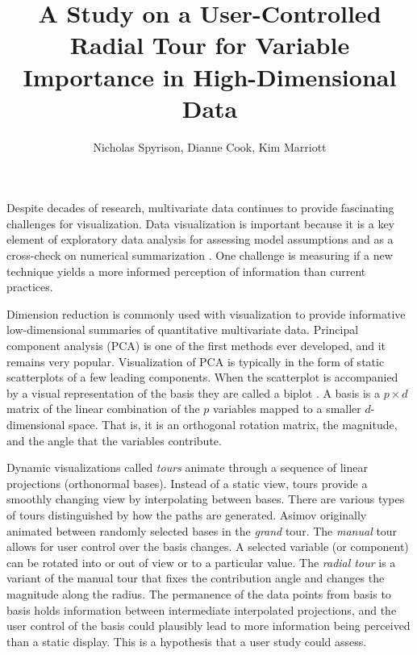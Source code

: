 \documentclass[review,journal]{vgtc}         %
\title{A Study on a User-Controlled Radial Tour for Variable Importance in High-Dimensional Data}
\author{Nicholas Spyrison, Dianne Cook, Kim Marriott}
\begin{document}

\maketitle


% 

Despite decades of research, multivariate data continues to provide fascinating challenges for visualization. Data visualization is important because it is a key element of exploratory data analysis \cite{tukey_exploratory_1977} for assessing model assumptions and as a cross-check on numerical summarization \cite{anscombe_graphs_1973, matejka_same_2017, yanai_hypothesis_2020}. One challenge is measuring if a new technique yields a more informed perception of information than current practices.

Dimension reduction is commonly used with visualization to provide informative low-dimensional summaries of quantitative multivariate data. Principal component analysis (PCA) \cite{pearson_liii._1901} is one of the first methods ever developed, and it remains very popular. Visualization of PCA is typically in the form of static scatterplots of a few leading components. When the scatterplot is accompanied by a visual representation of the basis they are called a biplot \cite{gabriel_biplot_1971}. A basis is a \(p \times d\) matrix of the linear combination of the \(p\) variables mapped to a smaller \(d\)-dimensional space. That is, it is an orthogonal rotation matrix, the magnitude, and the angle that the variables contribute.

Dynamic visualizations called \emph{tours} \cite{asimov_grand_1985} animate through a sequence of linear projections (orthonormal bases). Instead of a static view, tours provide a smoothly changing view by interpolating between bases. There are various types of tours distinguished by how the paths are generated. Asimov originally animated between randomly selected bases in the \emph{grand} tour. The \emph{manual} tour \cite{cook_manual_1997} allows for user control over the basis changes. A selected variable (or component) can be rotated into or out of view or to a particular value. The \emph{radial tour} \cite{spyrison_spinifex_2020} is a variant of the manual tour that fixes the contribution angle and changes the magnitude along the radius. The permanence of the data points from basis to basis holds information between intermediate interpolated projections, and the user control of the basis could plausibly lead to more information being perceived than a static display. This is a hypothesis that a user study could assess.
\end{document}
